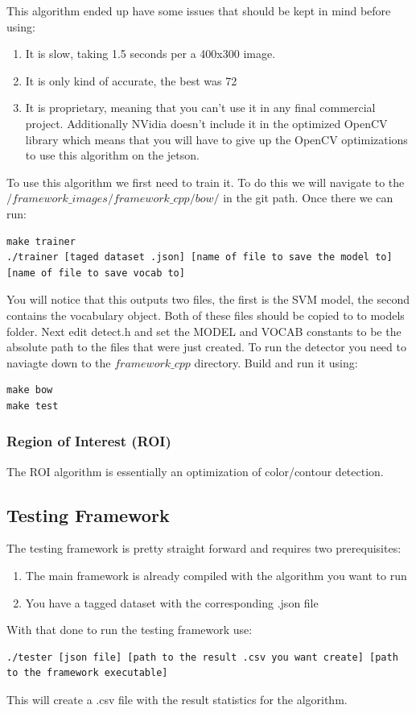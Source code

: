 \documentclass[letterpaper,10pt,titlepage]{article}
\begin{document}
This algorithm ended up have some issues that should be kept in mind before using:
\begin{enumerate}
    \item It is slow, taking 1.5 seconds per a 400x300 image.
    \item It is only kind of accurate, the best was 72%
    \item It is proprietary, meaning that you can't use it in any final commercial project.
        Additionally NVidia doesn't include it in the optimized OpenCV library
        which means that you will have to give up the OpenCV optimizations
        to use this algorithm on the jetson.
\end{enumerate}

To use this algorithm we first need to train it. To do this we will navigate to the
$/framework\_images/framework\_cpp/bow/$ in the git path. Once there we can run:
\begin{lstlisting}
make trainer
./trainer [taged dataset .json] [name of file to save the model to] [name of file to save vocab to]
\end{lstlisting}

You will notice that this outputs two files, the first is the SVM model, the second 
contains the vocabulary object. Both of these files should be copied to to models 
folder. Next edit detect.h and set the MODEL and VOCAB constants to be the absolute
path to the files that were just created. To run the detector you need to naviagte 
down to the $framework\_cpp$ directory. Build and run it using:
\begin{lstlisting}
make bow
make test
\end{lstlisting}

\subsubsection*{Region of Interest (ROI)}

The ROI algorithm is essentially an optimization of color/contour detection. 


\subsection*{Testing Framework}

The testing framework is pretty straight forward and requires two prerequisites:
\begin{enumerate}
    \item The main framework is already compiled with the algorithm you want to run
    \item You have a tagged dataset with the corresponding .json file 
\end{enumerate}
With that done to run the testing framework use:
\begin{lstlisting}
./tester [json file] [path to the result .csv you want create] [path to the framework executable]
\end{lstlisting}
This will create a .csv file with the result statistics for the algorithm.
\end{document}
